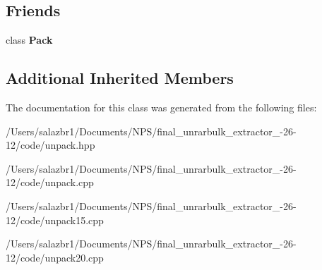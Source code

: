 \subsection*{Friends}
\begin{DoxyCompactItemize}
\item 
\hypertarget{class_unpack_ac043485674645a0ae476481e1fdec631}{class {\bfseries Pack}}\label{class_unpack_ac043485674645a0ae476481e1fdec631}

\end{DoxyCompactItemize}
\subsection*{Additional Inherited Members}


The documentation for this class was generated from the following files\-:\begin{DoxyCompactItemize}
\item 
/\-Users/salazbr1/\-Documents/\-N\-P\-S/final\-\_\-unrarbulk\-\_\-extractor\-\_-\/26-\/12/code/unpack.\-hpp\item 
/\-Users/salazbr1/\-Documents/\-N\-P\-S/final\-\_\-unrarbulk\-\_\-extractor\-\_-\/26-\/12/code/unpack.\-cpp\item 
/\-Users/salazbr1/\-Documents/\-N\-P\-S/final\-\_\-unrarbulk\-\_\-extractor\-\_-\/26-\/12/code/unpack15.\-cpp\item 
/\-Users/salazbr1/\-Documents/\-N\-P\-S/final\-\_\-unrarbulk\-\_\-extractor\-\_-\/26-\/12/code/unpack20.\-cpp\end{DoxyCompactItemize}
